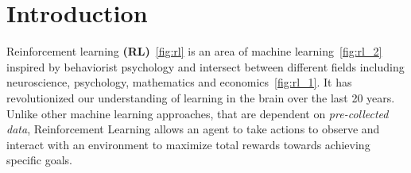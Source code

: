 
\chapter{Introduction}\label{chapter:introduction}

Reinforcement learning \textbf{(RL)}~\ref{fig:rl} is an area of machine learning~\ref{fig:rl_2} inspired by behaviorist psychology and intersect between different fields including neuroscience, psychology, mathematics and economics~\ref{fig:rl_1}. It has revolutionized our understanding of learning in the brain over the last 20 years. Unlike other machine learning approaches, that are dependent on \textit{pre-collected data}, Reinforcement Learning allows an agent to take actions to observe and interact with an environment to maximize total rewards towards achieving specific goals.

